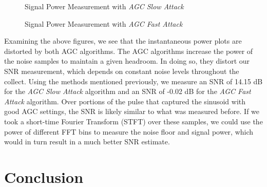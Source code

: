 \documentclass{article}
\begin{document}
\begin{figure}[H]
	\centerline{}
	\caption{Signal Power Measurement with \textit{AGC Slow Attack}}
	\label{fig::snr_agc_slow_attack_30db_tx_atten}
\end{figure}

\begin{figure}[H]
	\centerline{}
	\caption{Signal Power Measurement with \textit{AGC Fast Attack}}
	\label{fig::snr_agc_fast_attack_30db_tx_atten}
\end{figure}

Examining the above figures, we see that the instantaneous power plots are distorted by both AGC algorithms. The AGC algorithms increase the power of the noise samples to maintain a given headroom. In doing so, they distort our SNR measurement, which depends on constant noise levels throughout the collect. Using the methods mentioned previously, we measure an SNR of 14.15 dB for the \textit{AGC Slow Attack} algorithm and an SNR of -0.02 dB for the \textit{AGC Fast Attack} algorithm. Over portions of the pulse that captured the sinusoid with good AGC settings, the SNR is likely similar to what was measured before. If we took a short-time Fourier Transform (STFT) over these samples, we could use the power of different FFT bins to measure the noise floor and signal power, which would in turn result in a much better SNR estimate. 

\section{Conclusion}
\end{document}
